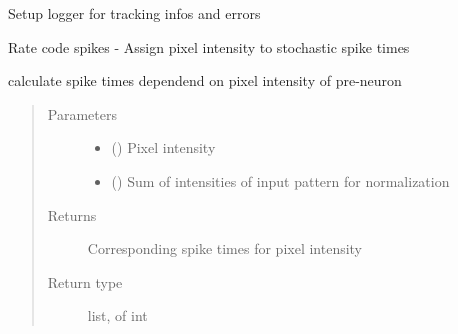 \documentclass[letterpaper,10pt,english]{sphinxmanual}
\begin{document}
\begin{fulllineitems}
\begin{quote}
\begin{description}
\begin{itemize}
\end{itemize}

\end{description}\end{quote}

\begin{fulllineitems}
\label{\detokenize{SpikingConvNet:SpikingConvNet.utils.RunControl.setup_logger}}
Setup logger for tracking infos and errors

\end{fulllineitems}


\end{fulllineitems}


\begin{fulllineitems}
\label{\detokenize{SpikingConvNet:SpikingConvNet.utils.convert_rate_code}}
Rate code spikes - Assign pixel intensity to stochastic spike times

calculate spike times dependend on pixel intensity of pre-neuron
\begin{quote}\begin{description}
\item[{Parameters}] \leavevmode\begin{itemize}
\item {} 
 () \textendash{} Pixel intensity

\item {} 
 () \textendash{} Sum of intensities of input pattern for normalization

\end{itemize}

\item[{Returns}] \leavevmode
{} \textendash{} Corresponding spike times for pixel intensity

\item[{Return type}] \leavevmode
list, of int

\end{description}\end{quote}

\end{fulllineitems}
\end{document}
